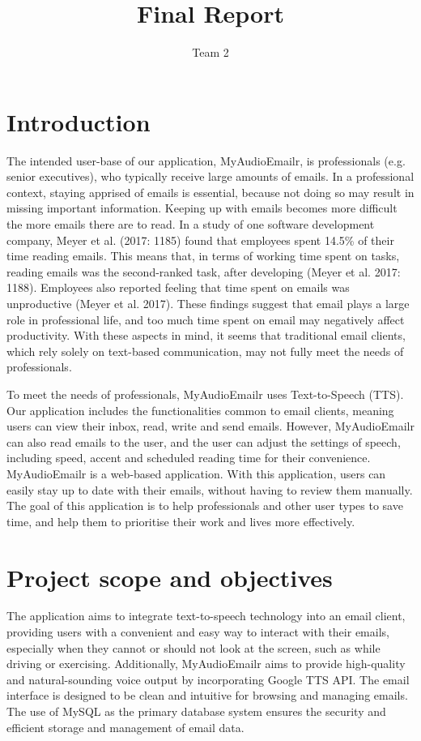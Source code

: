 \documentclass{article}
\title{Final Report}
\author{Team 2}
\begin{document}
\maketitle

\section{Introduction}

The intended user-base of our application, MyAudioEmailr, is professionals (e.g. senior executives), who typically receive large amounts of emails. In a professional context, staying apprised of emails is essential, because not doing so may result in missing important information. Keeping up with emails becomes more difficult the more emails there are to read. In a study of one software development company, Meyer et al. (2017: 1185) found that employees spent 14.5\% of their time reading emails. This means that, in terms of working time spent on tasks, reading emails was the second-ranked task, after developing (Meyer et al. 2017: 1188). Employees also reported feeling that time spent on emails was unproductive (Meyer et al. 2017). These findings suggest that email plays a large role in professional life, and too much time spent on email may negatively affect productivity. With these aspects in mind, it seems that traditional email clients, which rely solely on text-based communication, may not fully meet the needs of professionals. 


To meet the needs of professionals, MyAudioEmailr uses Text-to-Speech (TTS). Our application includes the functionalities common to email clients, meaning users can view their inbox, read, write and send emails. However, MyAudioEmailr can also read emails to the user, and the user can adjust the settings of speech, including speed, accent and scheduled reading time for their convenience. MyAudioEmailr is a web-based application. With this application, users can easily stay up to date with their emails, without having to review them manually. The goal of this application is to help professionals and other user types to save time, and help them to prioritise their work and lives more effectively.

\section{Project scope and objectives}
 The application aims to integrate text-to-speech technology into an email client, providing users with a convenient and easy way to interact with their emails, especially when they cannot or should not look at the screen, such as while driving or exercising. Additionally, MyAudioEmailr aims to provide high-quality and natural-sounding voice output by incorporating Google TTS API. The email interface is designed to be clean and intuitive for browsing and managing emails. The use of MySQL as the primary database system ensures the security and efficient storage and management of email data.
\end{document}
